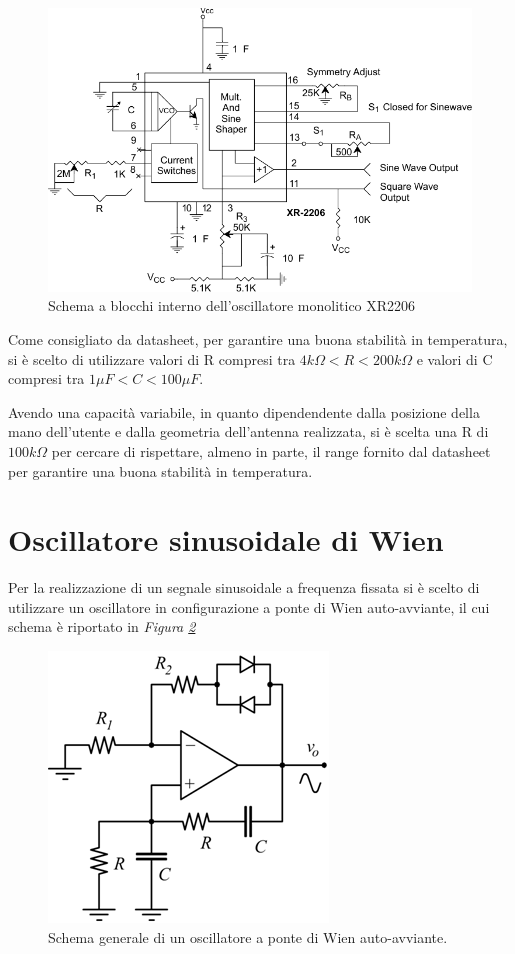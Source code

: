 \documentclass[titlepage]{report}
\begin{document}
	\begin{figure}[h]
		\centering
		\includegraphics[scale=1]{Immagini/schema_xr2206.pdf}
		\caption{Schema a blocchi interno dell'oscillatore monolitico XR2206}
		\label{fig:sch_xr2206_}
	\end{figure}
	\newpage

	\noindent
	Come consigliato da datasheet, per garantire una buona stabilità in temperatura, si è scelto di utilizzare valori di R compresi tra $4k\Omega < R < 200k\Omega$ e valori di C compresi tra $1\mu F < C < 100\mu F$.
	
	\noindent Avendo una capacità variabile, in quanto dipendendente dalla posizione della mano dell'utente e dalla geometria dell'antenna realizzata, si è scelta una R di $100k\Omega$ per cercare di rispettare, almeno in parte, il range fornito dal datasheet per garantire una buona stabilità in temperatura. 

	
\section{Oscillatore sinusoidale di Wien}
	\label{sec:osc_wien}
	Per la realizzazione di un segnale sinusoidale a frequenza fissata si è scelto di utilizzare un oscillatore in configurazione a ponte di Wien auto-avviante, il cui schema è riportato in \textit{Figura \ref{fig:sch_osc_wien}}
	
	\begin{figure}[h]
		\centering
		\includegraphics[scale=0.7]{Immagini/sch_osc_wien.png}
		\caption{Schema generale di un oscillatore a ponte di Wien auto-avviante.}
		\label{fig:sch_osc_wien}
	\end{figure}
\end{document}
